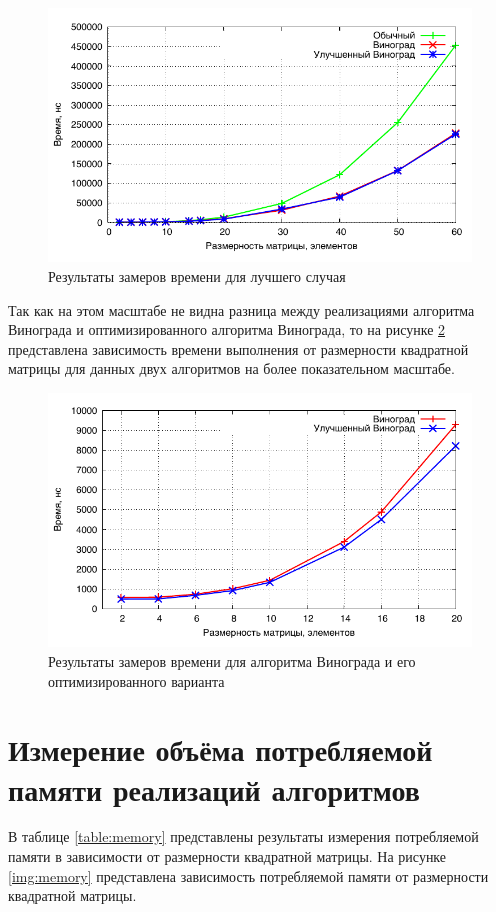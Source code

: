 \newpage

\noindent
\begin{figure}[h!]
	\centering
    \includegraphics[width=0.75\linewidth]{../data/time_best}
    \caption{Результаты замеров времени для лучшего случая}
    \label{img:time_best}
\end{figure}

Так как на этом масштабе не видна разница между реализациями алгоритма Винограда и оптимизированного алгоритма Винограда, то на рисунке \ref{img:time_winograd_best} представлена зависимость времени выполнения от размерности квадратной матрицы для данных двух алгоритмов на более показательном масштабе.

\noindent
\begin{figure}[h!]
	\centering
    \includegraphics[width=0.75\linewidth]{../data/time_winograd_best}
    \caption{Результаты замеров времени для алгоритма Винограда и его оптимизированного варианта}
    \label{img:time_winograd_best}
\end{figure}


\section{Измерение объёма потребляемой памяти реализаций алгоритмов}

В таблице \ref{table:memory} представлены результаты измерения потребляемой памяти в зависимости от размерности квадратной матрицы. На рисунке \ref{img:memory} представлена зависимость потребляемой памяти от размерности квадратной матрицы.

